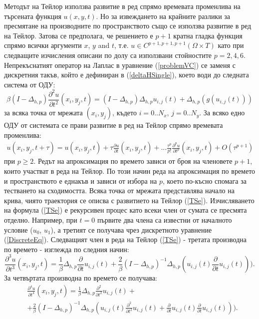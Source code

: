 \documentclass{article}
\newcommand{\be}{\begin{equation}}
\newcommand{\ee}{\end{equation}}
\newcommand{\rf}[1]{(\ref{#1})}
\begin{document}
Методът на Тейлор използва развитие в ред спрямо времевата променлива на търсената функция $u(x,y,t)$. Но за извеждането на крайните разлики за пресмятане на производните по пространството също се използва развитие в ред на Тейлор. Затова се предполага, че решението е $p+1$ кратна гладка функция спрямо всички аргументи $x$, $y$ and $t$, т.е. $u \in C^{p+1,p+1,p+1}(\Omega \times T)$ като при следващите изчисления описани по долу са използвани стойностите $p=2,4,6$. Непрекъснатият оператор на Лаплас в уравнение \rf{problemVC} се заменя с дискретния такъв, който е дефиниран в \rf{deltaHSingle}, което води до следната система от ОДУ:
\be \label{DiscreteEq}
\beta (I-\Delta_{h,p}) \frac{\partial^2 u}{\partial t^2}(x_i, y_j, t)=
 (I - \Delta_{h,p})\Delta_{h,p} u_{i, j}(t) + \Delta_{h,p} ( g( u_{i, j}(t) ) )
\ee
за всяка точка от мрежата $(x_i, y_j)$, където $i = 0..N_x$, $j=0..N_y$. За всяко едно ОДУ от системата се прави развитие в ред на Тейлор спрямо времевата променлива:
\begin{align} \label{TSe}
u(x_i, y_j, t+\tau) = u(x_i, y_j, t) + \tau \frac{ \partial u }{ \partial t }(x_i, y_j, t)  + ... 
\frac{ \tau^p }{ p! } \frac{ \partial^p u }{ \partial t^p }(x_i, y_j, t) + O(\tau^{p+1})
\end{align}
при $p \ge 2$. Редът на апроксимация по времето зависи от броя на членовете $p+1$, които участват в реда на Тейлор. По този начин реда на апроксимация по времето и пространството е еднакъв и зависи от избора на $p$, което по-късно спомага за тестването на сходимостта. Всяка точка от мрежата представлява начало на крива, чиято траектория се описва с развитието на Тейлор \rf{TSe}. Изчисляването на формула \rf{TSe} е рекурсивен процес като всеки член от сумата се пресмята отделно. Например, при $t=0$ първите два члена са известни от началното условие ($u_0$, $u_1$), а третият се получава чрез дискретното уравнение \rf{DiscreteEq}.  Следващият член в реда на Тейлор \rf{TSe} - третата производна по времето - изглежда по следния начин:
\be \label{der3}
 \frac{\partial^3 u}{\partial t^3}(x_i, y_j, t) =
\frac{1}{\beta}\Delta_{h,p} \frac{\partial}{\partial t}u_{i, j}(t) + \frac{2}{\beta}(I-\Delta_{h,p})^{-1}\Delta_{h,p} ( u_{i, j}(t) \frac{\partial}{\partial t}u_{i, j}(t) ) ).
\ee
За четвъртата производна по времето се получава:
\begin{align} \label{der4}
&\frac{\partial^4 u}{\partial t^4}(x_i, y_j, t) = \frac{1}{\beta}\Delta_{h,p} \frac{\partial^2}{\partial t^2}u_{i, j}(t) +   \nonumber\\
&+ \frac{2}{\beta}(I-\Delta_{h,p})^{-1}\Delta_{h,p} (u_{i, j}(t)\frac{\partial^2}{\partial t^2}u_{i, j}(t) + \frac{\partial}{\partial t}u_{i, j}(t)\frac{\partial}{\partial t}u_{i, j}(t)  ) ).
\end{align}
\end{document}
